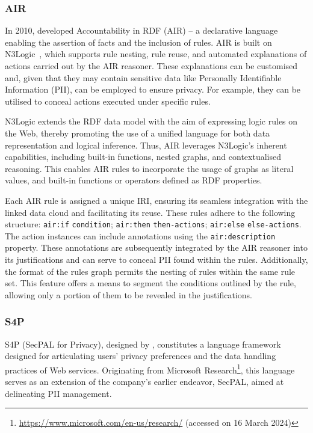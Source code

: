 \subsubsection{AIR}
\label{sec:air}

In 2010, \citeauthor{hitzler_analyzing_2010} developed Accountability in RDF (AIR) -- a declarative language enabling the assertion of facts and the inclusion of rules.
AIR is built on N3Logic~\citep{berners-lee_n3logic_2008}, which supports rule nesting, rule reuse, and automated explanations of actions carried out by the AIR reasoner. 
These explanations can be customised and, given that they may contain sensitive data like Personally Identifiable Information (PII), can be employed to ensure privacy.
For example, they can be utilised to conceal actions executed under specific rules.

N3Logic extends the RDF data model with the aim of expressing logic rules on the Web, thereby promoting the use of a unified language for both data representation and logical inference.
Thus, AIR leverages N3Logic's inherent capabilities, including built-in functions, nested graphs, and contextualised reasoning.
This enables AIR rules to incorporate the usage of graphs as literal values, and built-in functions or operators defined as RDF properties.

Each AIR rule is assigned a unique IRI, ensuring its seamless integration with the linked data cloud and facilitating its reuse.
These rules adhere to the following structure: \texttt{air:if} \texttt{condition}; \texttt{air:then} \texttt{then-actions}; \texttt{air:else} \texttt{else-actions}.
The action instances can include annotations using the \texttt{air:description} property.
These annotations are subsequently integrated by the AIR reasoner into its justifications and can serve to conceal PII found within the rules.
Additionally, the format of the rules graph permits the nesting of rules within the same rule set.
This feature offers a means to segment the conditions outlined by the rule, allowing only a portion of them to be revealed in the justifications.

\subsubsection{S4P}
\label{sec:s4p}

S4P (SecPAL for Privacy), designed by \cite{becker_framework_2009, becker_s4p_2010}, constitutes a language framework designed for articulating users' privacy preferences and the data handling practices of Web services. Originating from Microsoft Research\footnote{\url{https://www.microsoft.com/en-us/research/} (accessed on 16 March 2024)}, this language serves as an extension of the company's earlier endeavor, SecPAL, aimed at delineating PII management.

